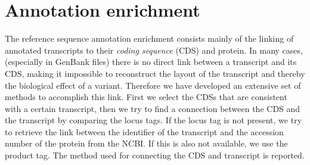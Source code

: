 \documentclass{article}
\begin{document}
\section{Annotation enrichment} \label{sec:enrichment}
The reference sequence annotation enrichment consists mainly of the linking of
annotated transcripts to their \emph{coding sequence} (CDS) and protein. In
many cases, (especially in GenBank files) there is no direct link between a
transcript and its CDS, making it impossible to reconstruct the layout of the
transcript and thereby the biological effect of a variant. Therefore we have
developed an extensive set of methods to accomplish this link. First we select
the CDSs that are consistent with a certain transcript, then we try to find a
connection between the CDS and the transcript by comparing the locus tags. If
the locus tag is not present, we try to retrieve the link between the
identifier of the transcript and the accession number of the protein from the
NCBI. If this is also not available, we use the product tag. The method used
for connecting the CDS and transcript is reported.
\end{document}
